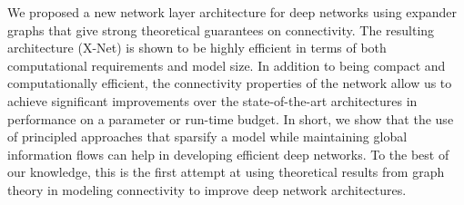 \noindent We proposed a new network layer architecture for deep networks using expander graphs that give strong theoretical guarantees on connectivity. The resulting architecture (X-Net) is shown to be highly efficient in terms of both computational requirements and model size. In addition to being compact and computationally efficient, the connectivity properties of the network allow us to achieve significant improvements over the state-of-the-art architectures in performance on a parameter or run-time budget. In short, we show that the use of principled approaches that sparsify a model while maintaining global information flows can help in developing efficient deep networks. To the best of our knowledge, this is the first attempt at using theoretical results from graph theory in modeling connectivity to improve deep network architectures.